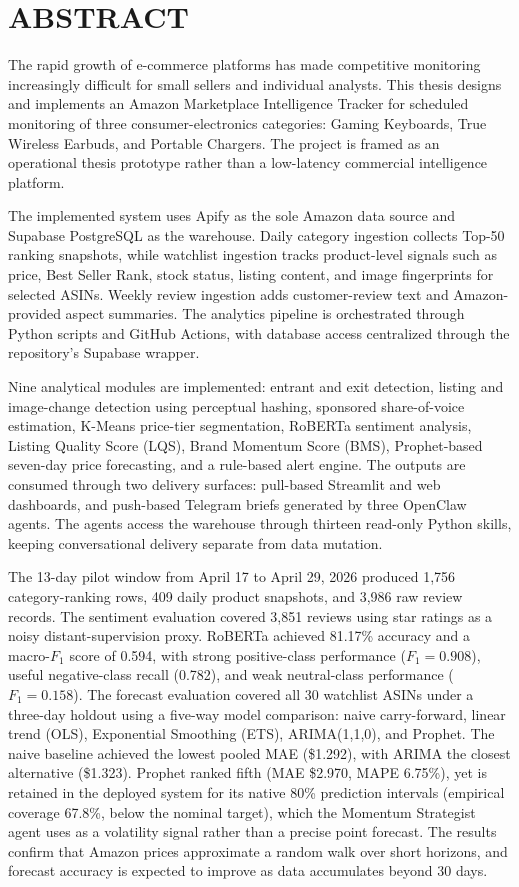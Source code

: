 \chapter*{ABSTRACT}

The rapid growth of e-commerce platforms has made competitive monitoring increasingly difficult for small sellers and individual analysts. This thesis designs and implements an Amazon Marketplace Intelligence Tracker for scheduled monitoring of three consumer-electronics categories: Gaming Keyboards, True Wireless Earbuds, and Portable Chargers. The project is framed as an operational thesis prototype rather than a low-latency commercial intelligence platform.

The implemented system uses Apify as the sole Amazon data source and Supabase PostgreSQL as the warehouse. Daily category ingestion collects Top-50 ranking snapshots, while watchlist ingestion tracks product-level signals such as price, Best Seller Rank, stock status, listing content, and image fingerprints for selected ASINs. Weekly review ingestion adds customer-review text and Amazon-provided aspect summaries. The analytics pipeline is orchestrated through Python scripts and GitHub Actions, with database access centralized through the repository's Supabase wrapper.

Nine analytical modules are implemented: entrant and exit detection, listing and image-change detection using perceptual hashing, sponsored share-of-voice estimation, K-Means price-tier segmentation, RoBERTa sentiment analysis, Listing Quality Score (LQS), Brand Momentum Score (BMS), Prophet-based seven-day price forecasting, and a rule-based alert engine. The outputs are consumed through two delivery surfaces: pull-based Streamlit and web dashboards, and push-based Telegram briefs generated by three OpenClaw agents. The agents access the warehouse through thirteen read-only Python skills, keeping conversational delivery separate from data mutation.

The 13-day pilot window from April 17 to April 29, 2026 produced 1,756 category-ranking rows, 409 daily product snapshots, and 3,986 raw review records. The sentiment evaluation covered 3,851 reviews using star ratings as a noisy distant-supervision proxy. RoBERTa achieved 81.17\% accuracy and a macro-$F_1$ score of 0.594, with strong positive-class performance ($F_1 = 0.908$), useful negative-class recall (0.782), and weak neutral-class performance ($F_1 = 0.158$). The forecast evaluation covered all 30 watchlist ASINs under a three-day holdout using a five-way model comparison: naive carry-forward, linear trend (OLS), Exponential Smoothing (ETS), ARIMA(1,1,0), and Prophet. The naive baseline achieved the lowest pooled MAE (\$1.292), with ARIMA the closest alternative (\$1.323). Prophet ranked fifth (MAE \$2.970, MAPE 6.75\%), yet is retained in the deployed system for its native 80\% prediction intervals (empirical coverage 67.8\%, below the nominal target), which the Momentum Strategist agent uses as a volatility signal rather than a precise point forecast. The results confirm that Amazon prices approximate a random walk over short horizons, and forecast accuracy is expected to improve as data accumulates beyond 30 days.

